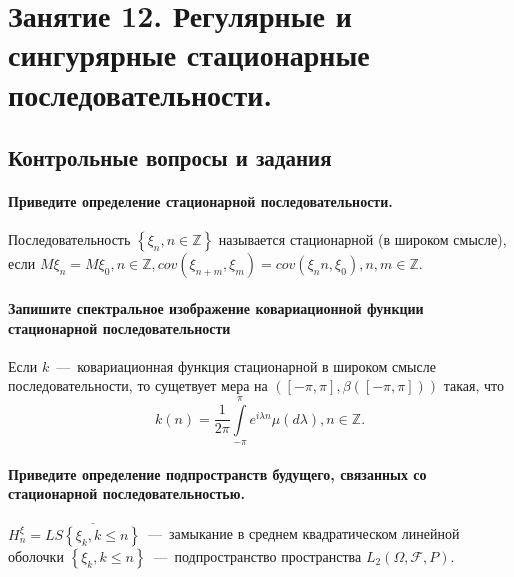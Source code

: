 \chapter*{Занятие 12. Регулярные и сингурярные стационарные последовательности.}

\section*{Контрольные вопросы и задания}

\subsubsection*{Приведите определение стационарной последовательности.}

Последовательность $ \left\{ \xi_n, n \in \mathbb{Z} \right\} $ называется стационарной
(в широком смысле), если
$M \xi_n = M \xi_0, n \in \mathbb{Z},
  cov \left( \xi_{n + m}, \xi_m \right) = cov \left( \xi_nn, \xi_0 \right), n, m \in \mathbb{Z}$.

\subsubsection*{Запишите спектральное изображение ковариационной функции стационарной
                последовательности}

Если $k$~---~ковариационная функция стационарной в широком смысле последовательности,
то сущетвует мера на
$ \left( \left[ -\pi, \pi \right], \beta \left( \left[ -\pi, \pi \right] \right) \right)$ такая, что
\begin{equation*}
  k \left( n \right) =
  \frac{1}{2 \pi } \int \limits_{-\pi }^{ \pi } e^{i \lambda n} \mu \left( d \lambda \right),
  n \in \mathbb{Z}.
\end{equation*}

\subsubsection*{Приведите определение подпространств будущего,
                связанных со стационарной последовательностью.}
$H_n^{ \xi } = \overline{LS \left\{ \xi_k, k \leq n \right\} }$~---~замыкание
в среднем квадратическом линейной оболочки
$ \left\{ \xi_k, k \leq n \right\} $~---~подпространство пространства
$L_2 \left( \Omega, \mathcal{F}, P \right) $.

